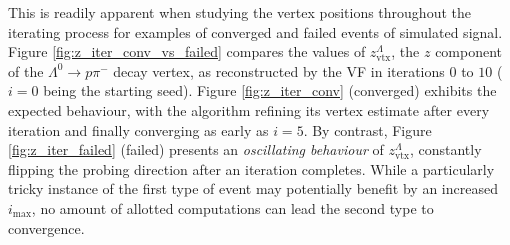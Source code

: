 This is readily apparent when studying the vertex positions throughout the iterating process for examples of converged and failed events of simulated signal.
Figure \ref{fig:z_iter_conv_vs_failed} compares the values of $z_\text{vtx}^\Lambda$, the $z$ component of the $\Lambda^0 \rightarrow p\pi^-$ decay vertex, as reconstructed by the VF in iterations $0$ to $10$ ($i=0$ being the starting seed).
Figure \ref{fig:z_iter_conv} (converged) exhibits the expected behaviour, with the algorithm refining its vertex estimate after every iteration and finally converging as early as $i=5$.
By contrast, Figure \ref{fig:z_iter_failed} (failed) presents an \textit{oscillating behaviour} of $z_\text{vtx}^\Lambda$, constantly flipping the probing direction after an iteration completes.
While a particularly tricky instance of the first type of event may potentially benefit by an increased $i_\text{max}$, no amount of allotted computations can lead the second type to convergence.

